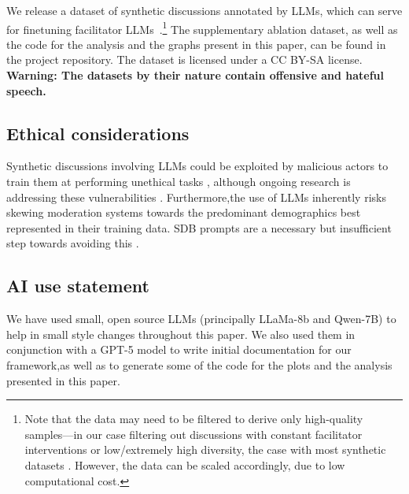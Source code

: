 We release a dataset of synthetic discussions annotated by LLMs, which can serve for finetuning facilitator LLMs~\cite{ulmer2024}.\footnote{Note that the data may need to be filtered to derive only high-quality samples---in our case filtering out discussions with constant facilitator interventions or low/extremely high diversity, the case with most synthetic datasets \cite{ulmer2024}. However, the data can be scaled accordingly, due to low computational cost.} The supplementary ablation dataset, as well as the code for the analysis and the graphs present in this paper, can be found in the project repository. The dataset is licensed under a CC BY-SA license. \textbf{Warning: The datasets by their nature contain offensive and hateful speech.}


\subsection{Ethical considerations}
\label{sec:discussion:ethical}
Synthetic discussions involving LLMs could be exploited by malicious actors to train them at performing unethical tasks \cite{majumdar_2024_nefarious,MARULLI20245340,li_2025_vulnerable}, although ongoing research is addressing these vulnerabilities \cite{wang_2025_risk}. Furthermore,the use of LLMs inherently risks skewing moderation systems towards the predominant demographics best represented in their training data. SDB prompts are a necessary but insufficient step towards avoiding this \cite{rossi_2024,anthis_2025,burton2024large}.

\subsection{AI use statement}
\label{sec:discussion:acknowledgments}
We have used small, open source LLMs (principally LLaMa-8b and Qwen-7B) to help in small style changes throughout this paper. We also used them in conjunction with a GPT-5 model \cite{openai2024gpt4technicalreport} to write initial documentation for our framework,as well as to generate some of the code for the plots and the analysis presented in this paper. 